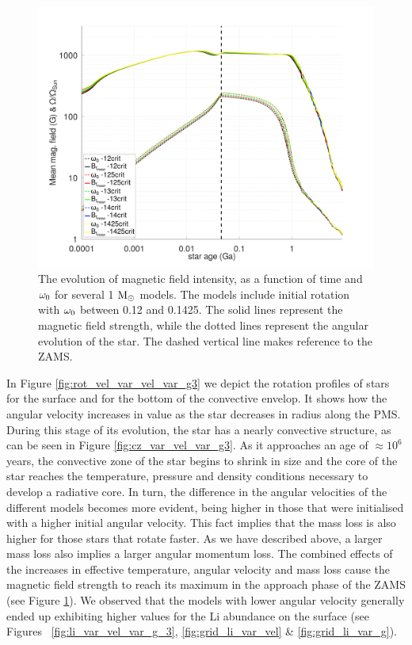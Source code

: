 \documentclass[fleqn,usenatbib]{mnras}
\begin{document}
\begin{figure}
	\includegraphics[clip,width=\columnwidth]{figures/paper2/mag_field_var_vel_g3.pdf}
    \caption{The evolution of magnetic field intensity, as a function of time and $\omega_{\mathrm{0}}$ for several 1 $\mathrm{M}_\odot$ models. The models include initial rotation with $\omega_{\mathrm{0}}$ between 0.12 and 0.1425. The solid lines represent the magnetic field strength, while the dotted lines represent the angular evolution of the star. The dashed vertical line makes reference to the ZAMS.}
    \label{fig:mag_field_var_vel_g3}
\end{figure}

In Figure \ref{fig:rot_vel_var_vel_var_g3} we depict the rotation profiles of stars for the surface and for the bottom of the convective envelop. It shows how the angular velocity increases in value as the star decreases in radius along the PMS. During this stage of its evolution, the star has a nearly convective structure, as can be seen in Figure \ref{fig:cz_var_vel_var_g3}. As it approaches an age of $\approx 10^6$ years, the convective zone of the star begins to shrink in size and the core of the star reaches the temperature, pressure and density conditions necessary to develop a radiative core. In turn, the difference in the angular velocities of the different models becomes more evident, being higher in those that were initialised with a higher initial angular velocity. This fact implies that the mass loss is also higher for those stars that rotate faster. As we have described above, a larger mass loss also implies a larger angular momentum loss. The combined effects of the increases in effective temperature, angular velocity and mass loss cause the magnetic field strength to reach its maximum in the approach phase of the ZAMS (see Figure \ref{fig:mag_field_var_vel_g3}). We observed that the models with lower angular velocity generally ended up exhibiting higher values for the Li abundance on the surface (see Figures~ \ref{fig:li_var_vel_var_g_3}, \ref{fig:grid_li_var_vel} \& \ref{fig:grid_li_var_g}).\par
\end{document}
